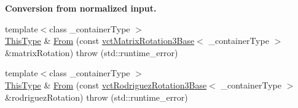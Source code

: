 \begin{Indent}{\bf Conversion from normalized input.}
\begin{DoxyCompactItemize}
\item 
{\footnotesize template$<$class \+\_\+container\+Type $>$ }\\\hyperlink{classvct_axis_angle_rotation3_af654a8037b7b82a378f69cb1bfd9b8dd}{This\+Type} \& \hyperlink{classvct_axis_angle_rotation3_a3466260e181f02ad123b838497643dba}{From} (const \hyperlink{classvct_matrix_rotation3_base}{vct\+Matrix\+Rotation3\+Base}$<$ \+\_\+container\+Type $>$ \&matrix\+Rotation)  throw (std\+::runtime\+\_\+error)
\item 
{\footnotesize template$<$class \+\_\+container\+Type $>$ }\\\hyperlink{classvct_axis_angle_rotation3_af654a8037b7b82a378f69cb1bfd9b8dd}{This\+Type} \& \hyperlink{classvct_axis_angle_rotation3_a024f33bed744a3c73469580a5de27555}{From} (const \hyperlink{classvct_rodriguez_rotation3_base}{vct\+Rodriguez\+Rotation3\+Base}$<$ \+\_\+container\+Type $>$ \&rodriguez\+Rotation)  throw (std\+::runtime\+\_\+error)
\end{DoxyCompactItemize}
\end{Indent}
